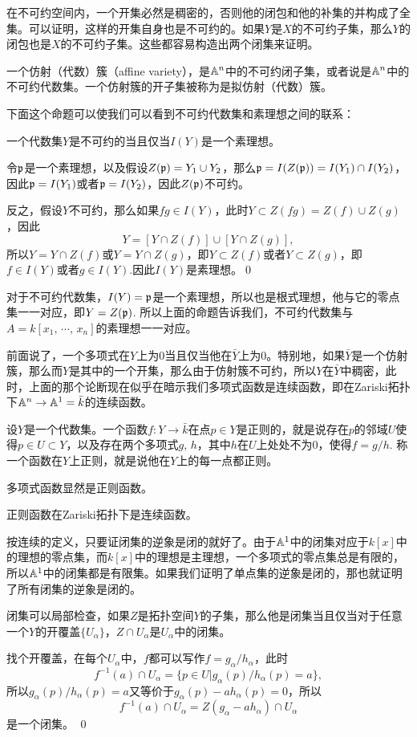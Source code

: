 在不可约空间内，一个开集必然是稠密的，否则他的闭包和他的补集的并构成了全集。可以证明，这样的开集自身也是不可约的。如果$Y$是$X$的不可约子集，那么$Y$的闭包也是$X$的不可约子集。这些都容易构造出两个闭集来证明。
 
\para 一个仿射（代数）簇（affine variety），是$\mathbb{A}^n$中的不可约闭子集，或者说是$\mathbb{A}^n$中的不可约代数集。一个仿射簇的开子集被称为是拟仿射（代数）簇。

下面这个命题可以使我们可以看到不可约代数集和素理想之间的联系：

\pro 一个代数集$Y$是不可约的当且仅当$I(Y)$是一个素理想。

\proof 令$\mathfrak{p}$是一个素理想，以及假设$Z(\mathfrak{p})=Y_1\cup Y_2$，那么$\mathfrak{p}=I(Z(\mathfrak{p}))=I(Y_1)\cap I(Y_2)$，因此$\mathfrak{p}=I(Y_1)$或者$\mathfrak{p}=I(Y_2)$，因此$Z(\mathfrak{p})$不可约。

反之，假设$Y$不可约，那么如果$fg\in I(Y)$，此时$Y\subset Z(fg)=Z(f)\cup Z(g)$，因此
\[
	Y=[Y\cap Z(f)]\cup [Y\cap Z(g)],
\]
所以$Y=Y\cap Z(f)$或$Y=Y\cap Z(g)$，即$Y\subset Z(f)$或者$Y\subset Z(g)$，即$f\in I(Y)$或者$g\in I(Y)$.因此$I(Y)$是素理想。\qed

对于不可约代数集，$I(Y)=\mathfrak{p}$是一个素理想，所以也是根式理想，他与它的零点集一一对应，即$Y=Z(\mathfrak{p})$. 所以上面的命题告诉我们，不可约代数集与$A=k[x_1,\,\cdots\!,\,x_n]$的素理想一一对应。

前面说了，一个多项式在$Y$上为$0$当且仅当他在$\bar{Y}$上为$0$。特别地，如果$\bar{Y}$是一个仿射簇，那么而$Y$是其中的一个开集，那么由于仿射簇不可约，所以$Y$在$\bar{Y}$中稠密，此时，上面的那个论断现在似乎在暗示我们多项式函数是连续函数，即在Zariski拓扑下$\mathbb{A}^n\to \mathbb{A}^1=\bar{k}$的连续函数。

\para 设$Y$是一个代数集。一个函数$f:Y\to \bar{k}$在点$p\in Y$是正则的，就是说存在$p$的邻域$U$使得$p\in U\subset Y$，以及存在两个多项式$g$, $h$，其中$h$在$U$上处处不为$0$，使得$f=g/h$. 称一个函数在$Y$上正则，就是说他在$Y$上的每一点都正则。

多项式函数显然是正则函数。

\pro 正则函数在Zariski拓扑下是连续函数。

\proof
	按连续的定义，只要证闭集的逆象是闭的就好了。由于$\mathbb{A}^1$中的闭集对应于$k[x]$中的理想的零点集，而$k[x]$中的理想是主理想，一个多项式的零点集总是有限的，所以$\mathbb{A}^1$中的闭集都是有限集。如果我们证明了单点集的逆象是闭的，那也就证明了所有闭集的逆象是闭的。

	闭集可以局部检查，如果$Z$是拓扑空间$Y$的子集，那么他是闭集当且仅当对于任意一个$Y$的开覆盖$\{U_\alpha\}$，$Z\cap U_\alpha$是$U_\alpha$中的闭集。

	找个开覆盖，在每个$U_\alpha$中，$f$都可以写作$f=g_\alpha/h_\alpha$，此时
	\[
		f^{-1}(a)\cap U_\alpha=\bigl\{p\in U| g_\alpha(p)/h_\alpha(p)=a\bigr\},
	\]
	所以$g_\alpha(p)/h_\alpha(p)=a$又等价于$g_\alpha(p)-ah_\alpha(p)=0$，所以
	\[
		f^{-1}(a)\cap U_\alpha=Z(g_\alpha-ah_\alpha)\cap U_\alpha
	\]
	是一个闭集。
\qed